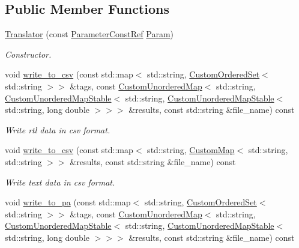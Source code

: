 \subsection*{Public Member Functions}
\begin{DoxyCompactItemize}
\item 
\hyperlink{classTranslator_a691eb72bfdf08e15506969d5cba6a400}{Translator} (const \hyperlink{Parameter_8hpp_a37841774a6fcb479b597fdf8955eb4ea}{Parameter\+Const\+Ref} \hyperlink{classTranslator_a3488e803db68b5e706c6d6a7bdadb25f}{Param})
\begin{DoxyCompactList}\small\item\em Constructor. \end{DoxyCompactList}\item 
void \hyperlink{classTranslator_ae0f2f5edae07acbef328584e64364377}{write\+\_\+to\+\_\+csv} (const std\+::map$<$ std\+::string, \hyperlink{classCustomOrderedSet}{Custom\+Ordered\+Set}$<$ std\+::string $>$$>$ \&tags, const \hyperlink{custom__map_8hpp_ad1ed68f2ff093683ab1a33522b144adc}{Custom\+Unordered\+Map}$<$ std\+::string, \hyperlink{custom__map_8hpp_a7314a7df1cdb3a3acf478ab86e95c226}{Custom\+Unordered\+Map\+Stable}$<$ std\+::string, \hyperlink{custom__map_8hpp_a7314a7df1cdb3a3acf478ab86e95c226}{Custom\+Unordered\+Map\+Stable}$<$ std\+::string, long double $>$$>$$>$ \&results, const std\+::string \&file\+\_\+name) const
\begin{DoxyCompactList}\small\item\em Write rtl data in csv format. \end{DoxyCompactList}\item 
void \hyperlink{classTranslator_aa1f3f77007cfc652a74f492197871dfb}{write\+\_\+to\+\_\+csv} (const std\+::map$<$ std\+::string, \hyperlink{custom__map_8hpp_a18ca01763abbe3e5623223bfe5aaac6b}{Custom\+Map}$<$ std\+::string, std\+::string $>$$>$ \&results, const std\+::string \&file\+\_\+name) const
\begin{DoxyCompactList}\small\item\em Write text data in csv format. \end{DoxyCompactList}\item 
void \hyperlink{classTranslator_a951eb4e033f27de62cd98dbb9dd23f52}{write\+\_\+to\+\_\+pa} (const std\+::map$<$ std\+::string, \hyperlink{classCustomOrderedSet}{Custom\+Ordered\+Set}$<$ std\+::string $>$$>$ \&tags, const \hyperlink{custom__map_8hpp_ad1ed68f2ff093683ab1a33522b144adc}{Custom\+Unordered\+Map}$<$ std\+::string, \hyperlink{custom__map_8hpp_a7314a7df1cdb3a3acf478ab86e95c226}{Custom\+Unordered\+Map\+Stable}$<$ std\+::string, \hyperlink{custom__map_8hpp_a7314a7df1cdb3a3acf478ab86e95c226}{Custom\+Unordered\+Map\+Stable}$<$ std\+::string, long double $>$$>$$>$ \&results, const std\+::string \&file\+\_\+name) const
$$
\end{DoxyCompactItemize}

